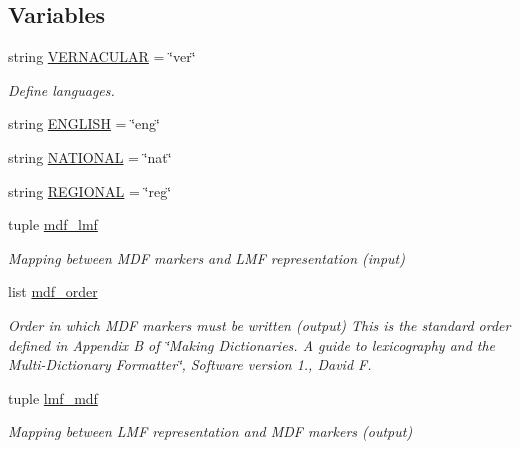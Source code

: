 \subsection*{Variables}
\begin{DoxyCompactItemize}
\item 
string \hyperlink{namespacelmf_1_1src_1_1config_1_1mdf_ae964bee79f865adc071d72a678dde128}{V\+E\+R\+N\+A\+C\+U\+L\+A\+R} = \char`\"{}ver\char`\"{}
\begin{DoxyCompactList}\small\item\em Define languages. \end{DoxyCompactList}\item 
string \hyperlink{namespacelmf_1_1src_1_1config_1_1mdf_ab4d5456356fada2592d7fb5d7e8ee780}{E\+N\+G\+L\+I\+S\+H} = \char`\"{}eng\char`\"{}
\item 
string \hyperlink{namespacelmf_1_1src_1_1config_1_1mdf_ae420b51631e5e37ccde4de5d72d05fae}{N\+A\+T\+I\+O\+N\+A\+L} = \char`\"{}nat\char`\"{}
\item 
string \hyperlink{namespacelmf_1_1src_1_1config_1_1mdf_ab52ee069b7cd6fa8b52afa15ea6f221e}{R\+E\+G\+I\+O\+N\+A\+L} = \char`\"{}reg\char`\"{}
\item 
tuple \hyperlink{namespacelmf_1_1src_1_1config_1_1mdf_a888cd9df8b9511d408e646dc404b5232}{mdf\+\_\+lmf}
\begin{DoxyCompactList}\small\item\em Mapping between M\+D\+F markers and L\+M\+F representation (input) \end{DoxyCompactList}\item 
list \hyperlink{namespacelmf_1_1src_1_1config_1_1mdf_afe5efb72442beb65b5083335b744845c}{mdf\+\_\+order}
\begin{DoxyCompactList}\small\item\em Order in which M\+D\+F markers must be written (output) This is the standard order defined in Appendix B of \char`\"{}\+Making Dictionaries. A guide to lexicography and the Multi-\/\+Dictionary Formatter\char`\"{}, Software version 1., David F. \end{DoxyCompactList}\item 
tuple \hyperlink{namespacelmf_1_1src_1_1config_1_1mdf_a78d8f1444783c1b86cbbd91f49a0cd4f}{lmf\+\_\+mdf}
\begin{DoxyCompactList}\small\item\em Mapping between L\+M\+F representation and M\+D\+F markers (output) \end{DoxyCompactList}\item 

\end{DoxyCompactItemize}
